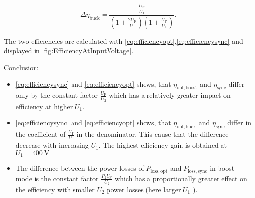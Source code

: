 \begin{solutionblock}
    \begin{equation}
        \Delta \eta_\mathrm{buck}= \frac{\frac{U_\mathrm{F}}{U_\mathrm{1}}}{\left(1+ \frac{2 U_\mathrm{F}}{U_\mathrm{1}}\right) \left(1+\frac{ U_\mathrm{F}}{U_\mathrm{1}}\right)}.
        \label{eq:efficiencygain}
    \end{equation}

    The two efficiencies are calculated with \eqref{eq:efficiencyopt},\eqref{eq:efficiencysync}  and displayed in \autoref{fig:EfficiencyAtInputVoltage}.
    


    Conclusion: \\
    \begin{itemize}
        \item \eqref{eq:efficiencysync} and \eqref{eq:efficiencyopt} shows, that $\eta_\mathrm{opt,boost}$ 
        and $\eta_\mathrm{sync}$ differ only by the constant factor $\frac{U_\mathrm{F}}{U_\mathrm{2}}$ 
        which has a relatively greater impact on efficiency at higher $U_\mathrm{1}$.
        \item \eqref{eq:efficiencysync} and \eqref{eq:efficiencyopt} shows, that $\eta_\mathrm{opt,buck}$ 
        and $\eta_\mathrm{sync}$ differ in the coefficient of $\frac{U_\mathrm{F}}{U_\mathrm{1}}$ in the denominator. 
        This cause that the difference decrease with increasing $U_\mathrm{1}$. The highest efficiency gain is obtained at $U_\mathrm{1}=\SI{400}{\volt}$
        \item The difference between the power losses of $P_\mathrm{loss,opt}$ and $P_\mathrm{loss,sync}$ in boost mode is the constant factor 
        $\frac{P_\mathrm{2} U_\mathrm{F}}{U_\mathrm{2}}$
        which has a proportionally greater effect on the efficiency with smaller $U_\mathrm{2}$ power losses (here larger $U_\mathrm{1}$ ).
    \end{itemize}      

\end{solutionblock}

